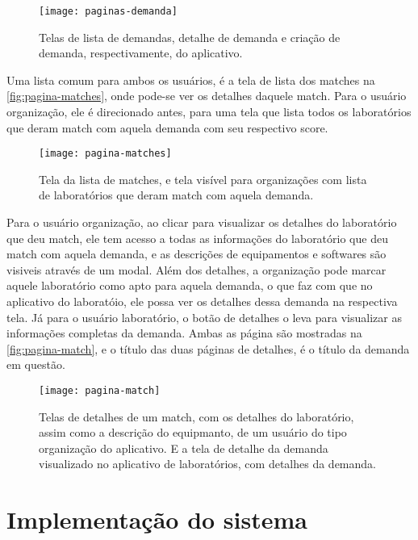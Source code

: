 \begin{figure}[H]
  \captionsetup{width=0.43\textwidth}
  \caption{Telas de lista de demandas, detalhe de demanda e criação de demanda, respectivamente, do aplicativo.}
  \label{fig:paginas-demanda}
  \texttt{[image: paginas-demanda]}
  \fonte{}
\end{figure}

Uma lista comum para ambos os usuários, é a tela de lista dos matches na \autoref{fig:pagina-matches}, onde pode-se ver os detalhes daquele match. Para o usuário organização, ele é direcionado antes, para uma tela que lista todos os laboratórios que deram match com aquela demanda com seu respectivo score.

\begin{figure}[H]
  \captionsetup{width=0.43\textwidth}
  \caption{Tela da lista de matches, e tela visível para organizações com lista de laboratórios que deram match com aquela demanda.}
  \label{fig:pagina-matches}
  \texttt{[image: pagina-matches]}
  \fonte{}
\end{figure}

Para o usuário organização, ao clicar para visualizar os detalhes do laboratório que deu match, ele tem acesso a todas as informações do laboratório que deu match com aquela demanda, e as descrições de equipamentos e softwares são visiveis através de um modal. Além dos detalhes, a organização pode marcar aquele laboratório como apto para aquela demanda, o que faz com que no aplicativo do laboratóio, ele possa ver os detalhes dessa demanda na respectiva tela. Já para o usuário laboratório, o botão de detalhes o leva para visualizar as informações completas da demanda. Ambas as página são mostradas na \autoref{fig:pagina-match}, e o título das duas páginas de detalhes, é o título da demanda em questão.

\begin{figure}[H]
  \captionsetup{width=0.43\textwidth}
  \caption{Telas de detalhes de um match, com os detalhes do laboratório, assim como a descrição do equipmanto, de um usuário do tipo organização do aplicativo. E a tela de detalhe da demanda visualizado no aplicativo de laboratórios, com detalhes da demanda.}
  \label{fig:pagina-match}
  \texttt{[image: pagina-match]}
  \fonte{}
\end{figure}


\section{Implementação do sistema}\label{sec:implementacao}


